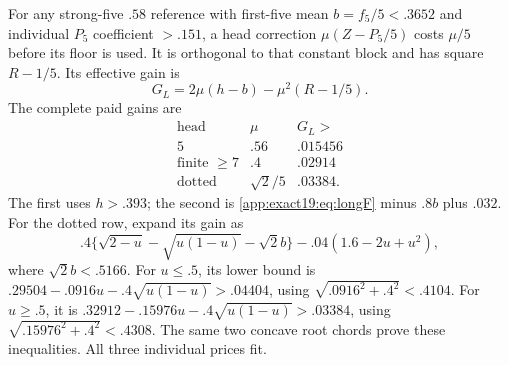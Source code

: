 For any strong-five \(.58\)
reference with first-five mean
\(b=f_5/5<.3652\) and individual
\(P_5\) coefficient \(>.151\),
a head correction
\(\mu(Z-P_5/5)\) costs \(\mu/5\)
before its floor is used.
It is orthogonal to that constant
block and has square \(R-1/5\).
Its effective gain is
\[
                             G_L=2\mu(h-b)-\mu^2(R-1/5).
\]
The complete paid gains are
\[
\begin{array}{c|c|c}
 \text{head}&\mu&G_L>\\ \hline
 5&.56&.015456\\
 \text{finite }\ge7&.4&.02914\\
 \text{dotted}&\sqrt2/5&.03384 .
\end{array}
\tag{B19headgains}\label{app:exact19:eq:Bheadgains}
\]
The first uses \(h>.393\);
the second is
\eqref{app:exact19:eq:longF}
minus \(.8b\) plus \(.032\).
For the dotted row, expand its
gain as
\[
 .4\{\sqrt{2-u}-\sqrt{u(1-u)}-\sqrt2b\}
                                -.04(1.6-2u+u^2),
\]
where \(\sqrt2b<.5166\).
For \(u\le.5\), its lower bound is
\(.29504-.0916u-.4\sqrt{u(1-u)}>.04404\),
using \(\sqrt{.0916^2+.4^2}<.4104\).
For \(u\ge.5\), it is
\(.32912-.15976u-.4\sqrt{u(1-u)}>.03384\),
using \(\sqrt{.15976^2+.4^2}<.4308\).
The same two concave root chords
prove these inequalities.
All three individual prices fit.

